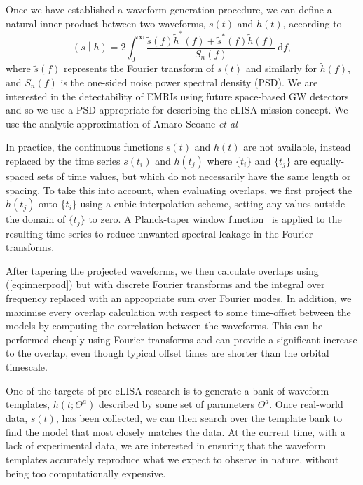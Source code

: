 \documentclass[aps,prd,amsfonts,amssymb,amsmath,nofootinbib,reprint,showpacs,superscriptaddress,twocolumn]{revtex4}
\newcommand{\eqnref}[1]{(\ref{eq:#1})}
\newcommand{\dd}{\ensuremath{\mathrm{d}}}
\newcommand{\intd}[4]{\ensuremath{\int_{#1}^{#2}{#3}\,\dd{#4}}}
\newcommand{\overlap}[2]{\ensuremath{\left(#1\middle|#2\right)}}
\begin{document}
Once we have established a waveform generation procedure, we can define a natural inner product between two waveforms, $s(t)$ and $h(t)$, according to
\begin{equation}
\label{eq:innerprod}
\overlap{s}{h} = 2 \intd{0}{\infty}{\frac{\tilde{s}(f)\tilde{h}^*(f)+\tilde{s}^*(f)\tilde{h}(f)}{S_n(f)}}{f},
\end{equation}
where $\tilde{s}(f)$ represents the Fourier transform of $s(t)$ and similarly for $\tilde{h}(f)$, and $S_n(f)$ is the one-sided noise power spectral density (PSD). We are interested in the detectability of EMRIs using future space-based GW detectors and so we use a PSD appropriate for describing the eLISA mission concept. We use the analytic approximation of Amaro-Seoane \emph{et al}~\cite{Amaro-Seoane2012a}

In practice, the continuous functions $s(t)$ and $h(t)$ are not available, instead replaced by the time series $s(t_i)$ and $h(t_j)$ where $\{t_i\}$ and $\{t_j\}$ are equally-spaced sets of time values, but which do not necessarily have the same length or spacing. To take this into account, when evaluating overlaps, we first project the $h(t_j)$ onto $\{t_i\}$ using a cubic interpolation scheme, setting any values outside the domain of $\{t_j\}$ to zero. A Planck-taper window function~\cite{McKechan2010} is applied to the resulting time series to reduce unwanted spectral leakage in the Fourier transforms.

After tapering the projected waveforms, we then calculate overlaps using \eqnref{innerprod} but with discrete Fourier transforms and the integral over frequency replaced with an appropriate sum over Fourier modes. In addition, we maximise every overlap calculation with respect to some time-offset between the models by computing the correlation between the waveforms. This can be performed cheaply using Fourier transforms and can provide a significant increase to the overlap, even though typical offset times are shorter than the orbital timescale.


One of the targets of pre-eLISA research is to generate a bank of waveform templates, $h(t;\Theta^a)$ described by some set of parameters $\Theta^a$. Once real-world data, $s(t)$, has been collected, we can then search over the template bank to find the model that most closely matches the data. At the current time, with a lack of experimental data, we are interested in ensuring that the waveform templates accurately reproduce what we expect to observe in nature, without being too computationally expensive.
\end{document}
